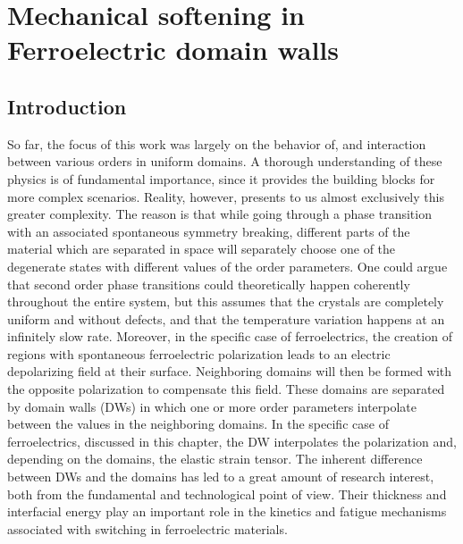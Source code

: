 \chapter{Mechanical softening in Ferroelectric domain walls}


\section{Introduction}
So far, the focus of this work was largely on the behavior of, and interaction between various orders in uniform domains.
A thorough understanding of these physics is of fundamental importance, since it provides the building blocks for more complex scenarios.
Reality, however, presents to us almost exclusively this greater complexity.
The reason is that while going through a phase transition with an associated spontaneous symmetry breaking, different parts of the material which are separated in space will separately choose one of the degenerate states with different values of the order parameters.
One could argue that second order phase transitions could theoretically happen coherently throughout the entire system, but this assumes that the crystals are completely uniform and without defects, and that the temperature variation happens at an infinitely slow rate.
Moreover, in the specific case of ferroelectrics, the creation of regions with spontaneous ferroelectric polarization leads to an electric depolarizing field at their surface.
Neighboring domains will then be formed with the opposite polarization to compensate this field.
These domains are separated by domain walls (DWs) in which one or more order parameters interpolate between the values in the neighboring domains.
In the specific case of ferroelectrics, discussed in this chapter, the DW interpolates the polarization and, depending on the domains, the elastic strain tensor.
The inherent difference between DWs and the domains has led to a great amount of research interest, both from the fundamental and technological point of view.
Their thickness and interfacial energy play an important role in the kinetics and fatigue mechanisms associated with switching in ferroelectric materials. 

